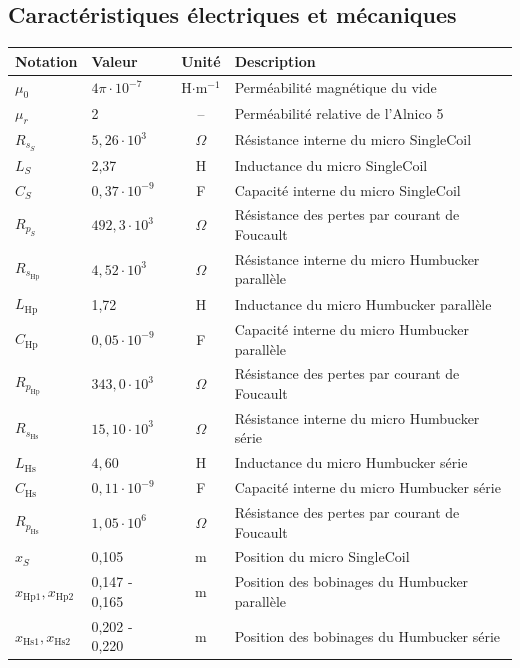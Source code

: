 \documentclass[a4paper,11pt]{article}
\begin{document}
\subsection{Caractéristiques électriques et mécaniques}
\begin{center}
\small
\begin{tabularx}{\textwidth}{llcX}
\toprule
\textbf{Notation} & \textbf{Valeur} & \textbf{Unité} & \textbf{Description} \\
\midrule
$\mu_{0}$ & $4\pi \cdot 10^{-7}$ & H$\cdot$m$^{-1}$ & Perméabilité magnétique du vide \\
$\mu_{r}$ & 2 & -- & Perméabilité relative de l'Alnico 5 \\
\midrule
$R_{s_S}$ & $5,26 \cdot 10^3$ & $\Omega$ & Résistance interne du micro SingleCoil \\
$L_{S}$ & 2,37 & H & Inductance du micro SingleCoil \\
$C_{S}$ & $0,37 \cdot 10^{-9}$ & F & Capacité interne du micro SingleCoil \\
$R_{p_S}$ & $492,3 \cdot 10^3$ & $\Omega$ & Résistance des pertes par courant de Foucault \\
\midrule
$R_{s_{\text{Hp}}}$ & $4,52 \cdot 10^3$ & $\Omega$ & Résistance interne du micro Humbucker parallèle \\
$L_{\text{Hp}}$ & 1,72 & H & Inductance du micro Humbucker parallèle \\
$C_{\text{Hp}}$ & $0,05 \cdot 10^{-9}$ & F & Capacité interne du micro Humbucker parallèle \\
$R_{p_{\text{Hp}}}$ & $343,0 \cdot 10^3$ & $\Omega$ & Résistance des pertes par courant de Foucault \\
\midrule
$R_{s_{\text{Hs}}}$ & $15,10 \cdot 10^3$ & $\Omega$ & Résistance interne du micro Humbucker série \\
$L_{\text{Hs}}$ & $4,60$ & H & Inductance du micro Humbucker série \\
$C_{\text{Hs}}$ & $0,11 \cdot 10^{-9}$ & F & Capacité interne du micro Humbucker série \\
$R_{p_{\text{Hs}}}$ & $1,05 \cdot 10^6$ & $\Omega$ & Résistance des pertes par courant de Foucault \\
\midrule
$x_{S}$ & 0,105 & m & Position du micro SingleCoil \\
$x_{\text{Hp1}}, x_{\text{Hp2}}$ & 0,147 - 0,165 & m & Position des bobinages du Humbucker parallèle \\
$x_{\text{Hs1}}, x_{\text{Hs2}}$ & 0,202 - 0,220 & m & Position des bobinages du Humbucker série \\

\end{tabularx}
\end{center}
\end{document}
